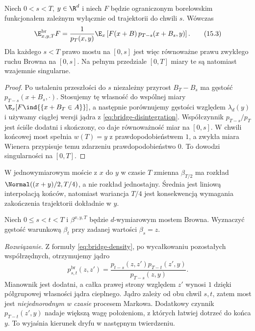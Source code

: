\begin{wniosek}
\label{cor:bridge-initial-density}
Niech $0<s<T$, $y\in\R^d$ i niech $F$ będzie
ograniczonym borelowskim funkcjonałem zależnym wyłącznie
od trajektorii do chwili $s$. Wówczas
\[
 \E_{x,y,T}^{\mathrm{br}}F
 =\frac{1}{p_T(x,y)}\E_x\left[
    F(x+B)\,p_{T-s}(x+B_s,y)\right].
\tag{15.3}\label{eq:bridge-likelihood}
\]
Dla każdego $s<T$ prawo mostu na $[0,s]$ jest więc
równoważne prawu zwykłego ruchu Browna na $[0,s]$.
Na pełnym przedziale $[0,T]$ miary te są natomiast
wzajemnie singularne.
\end{wniosek}
\begin{proof}
Po ustaleniu przeszłości do $s$ niezależny przyrost
$B_T-B_s$ ma gęstość $p_{T-s}(x+B_s,\cdot)$.
Stosujemy tę własność do wspólnej miary
$\E_x[F\ind{\{x+B_T\in A\}}]$, a następnie porównujemy
gęstości względem $\lambda_d(y)$ i używamy ciągłej wersji
jądra z \eqref{eq:bridge-disintegration}. Współczynnik
$p_{T-s}/p_T$ jest ściśle dodatni i skończony,
co daje równoważność miar na $[0,s]$.
W chwili końcowej most spełnia $w(T)=y$ z
prawdopodobieństwem $1$, a zwykła miara Wienera przypisuje
temu zdarzeniu prawdopodobieństwo $0$. To dowodzi
singularności na $[0,T]$.
\end{proof}

\begin{przyklad}
W jednowymiarowym moście z $x$ do $y$ w czasie $T$
zmienna $\beta_{T/2}$ ma rozkład
$\Normal((x+y)/2,T/4)$, a nie rozkład jednostajny.
Średnia jest liniową interpolacją końców, natomiast
wariancja $T/4$ jest konsekwencją wymagania zakończenia
trajektorii dokładnie w $y$.
\end{przyklad}



\begin{zadanie}
Niech $0\le s<t<T$ i $\beta^{x,y,T}$ będzie
$d$-wymiarowym mostem Browna. Wyznaczyć gęstość warunkową
$\beta_t$ przy zadanej wartości $\beta_s=z$.

\emph{Rozwiązanie.} Z formuły
\eqref{eq:bridge-density}, po wycałkowaniu pozostałych
współrzędnych, otrzymujemy jądro
\[
 p^{\mathrm{br}}_{s,t}(z,z')=
 \frac{p_{t-s}(z,z')p_{T-t}(z',y)}{p_{T-s}(z,y)}.
\]
Mianownik jest dodatni, a całka prawej strony względem
$z'$ wynosi $1$ dzięki półgrupowej własności jądra
cieplnego. Jądro zależy od obu chwil $s,t$, zatem most
jest \emph{niejednorodnym w czasie} procesem Markowa.
Dodatkowy czynnik $p_{T-t}(z',y)$ nadaje większą wagę
położeniom, z których łatwiej dotrzeć do końca $y$.
To wyjaśnia kierunek dryfu w następnym twierdzeniu.
\end{zadanie}


